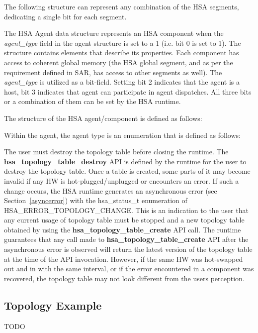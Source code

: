 \documentclass{book}
\newcommand{\reffun}[1]{\textbf{#1}}
\newcommand{\reffld}[1]{\textit{#1}}
\newcommand{\reftyp}[1]{#1}
\newcommand{\refenu}[1]{\reftyp{#1}}
\begin{document}
The following structure can represent any combination of the HSA
segments, dedicating a single bit for each segment.



The HSA Agent data structure represents an HSA component when the
\reffld{agent\_type} field in the agent structure is set to a 1
(i.e. bit 0 is set to 1).
The structure contains elements that describe its properties. Each
component has access to coherent global memory (the HSA global
segment, and as per the requirement defined in SAR, has access to
other segments as well). The \reffld{agent\_type} is utilized as a
bit-field. Setting bit 2 indicates that the agent is a host, bit 3
indicates that agent can participate in agent dispatches. All
three bits or a combination of them can be set by the HSA runtime.

The structure of the HSA agent/component is defined as follows:


Within the agent, the agent type is an enumeration that is defined
as follows:


The user must destroy the topology table before closing the runtime.
The \reffun{hsa\_topology\_table\_destroy} API is defined by the
runtime for the user to destroy the topology table. Once a table is
created, some parts of it may become invalid if any HW is
hot-plugged/unplugged or encounters an error. If such a change
occurs, the HSA runtime generates an asynchronous error (see
Section~\ref{asyncerror}) with the \reftyp{hsa\_status\_t} enumeration
of \refenu{HSA\_ERROR\_TOPOLOGY\_CHANGE}. This is an indication to the
user that any current usage of topology table must be stopped and a
new topology table obtained by using the
\reffun{hsa\_topology\_table\_create} API call. The runtime guarantees
that any call made to \reffun{hsa\_topology\_table\_create} API after
the asynchronous error is observed will return the latest version of
the topology table at the time of the API invocation. However, if
the same HW was hot-swapped out and in with the same interval, or if
the error encountered in a component was recovered, the topology
table may not look different from the users perception.

\hypertarget{topology_example}{} \subsection{Topology Example}
TODO
\end{document}
